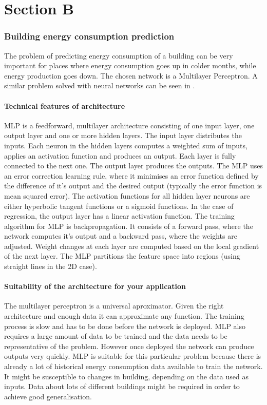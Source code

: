 \documentclass[a4paper, 11pt]{article}
\begin{document}
\part*{Section B}


\section{Building energy consumption prediction}
The problem of predicting energy consumption of a building can be very important for places where energy consumption goes up in colder months, while energy production goes down. The chosen network is a Multilayer Perceptron. A similar problem solved with neural networks can be seen in \cite{khosravani2016comparison}.
\subsection{Technical features of architecture}
MLP is a feedforward, multilayer architecture consisting of one input layer, one output layer and one or more hidden layers. The input layer distributes the inputs. Each neuron in the hidden layers computes a weighted sum of inputs, applies an activation function and produces an output. Each layer is fully connected to the next one. The output layer produces the outputs. The MLP uses an error correction learning rule, where it minimises an error function defined by the difference of it's output and the desired output (typically the error function is mean squared error). The activation functions for all hidden layer neurons are either hyperbolic tangent functions or a sigmoid functions. In the case of regression, the output layer has a linear activation function. The training algorithm for MLP is backpropagation. It consists of a forward pass, where the network computes it's output and a backward pass, where the weights are adjusted. Weight changes at each layer are computed based on the local gradient of the next layer. The MLP partitions the feature space into regions (using straight lines in the 2D case). 
\subsection{Suitability of the architecture for your application}
The multilayer perceptron is a universal aproximator. Given the right architecture and enough data it can approximate any function. The training process is slow and has to be done before the network is deployed. MLP also requires a large amount of data to be trained and the data needs to be representative of the problem. However once deployed the network can produce outputs very quickly. MLP is suitable for this particular problem because there is already a lot of historical energy consumption data available to train the network. It might be susceptible to changes in building, depending on the data used as inputs. Data about lots of different buildings might be required in order to achieve good generalisation.
\end{document}
